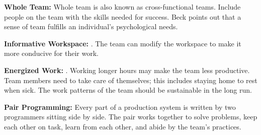 

\textbf{Whole Team:} Whole team is also known as cross-functional teams. Include people on the team with the skills needed for success. Beck points out that a sense of team fulfills an individual's psychological needs.  \cite{BeckExtremeProgramming2004}
 




\textbf{Informative Workspace:}  \cite{BeckExtremeProgramming2004}. The team can modify the workspace to make it more conducive for their work. 




\textbf{Energized Work:}  \cite{BeckExtremeProgramming2004}. Working longer hours may make the team less productive. Team members need to take care of themselves; this includes staying home to rest when sick. The work patterns of the team should be sustainable in the long run.


\textbf{Pair Programming:} Every part of a production system is written by two programmers sitting side by side. The pair works together to solve problems, keep each other on task, learn from each other, and abide by the team's practices.




